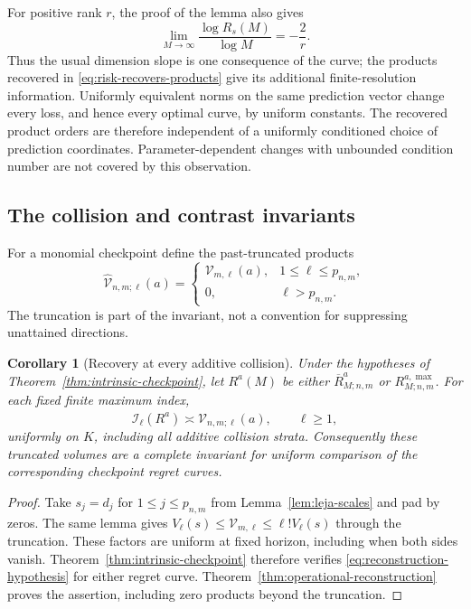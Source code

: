 \documentclass[11pt]{amsart}
\newtheorem{corollary}[theorem]{Corollary}
\theoremstyle{definition}\newtheorem{definition}[theorem]{Definition}
\theoremstyle{remark}\newtheorem{remark}[theorem]{Remark}
\begin{document}
For positive rank $r$, the proof of the lemma also gives
\[
 \lim_{M\to\infty}\frac{\log R_s(M)}{\log M}=-\frac2r.
\]
Thus the usual dimension slope is one consequence of the curve; the
products recovered in \eqref{eq:risk-recovers-products} give its
additional finite-resolution information. Uniformly equivalent norms
on the same prediction vector change every loss, and hence every
optimal curve, by uniform constants. The recovered product orders are
therefore independent of a uniformly conditioned choice of prediction
coordinates. Parameter-dependent changes with unbounded condition
number are not covered by this observation.

\subsection{The collision and contrast invariants}
For a monomial checkpoint define the past-truncated products
\[
 \widehat{\mathcal V}_{n,m;\ell}(a)=
 \begin{cases}
  \mathcal V_{m,\ell}(a),&1\le\ell\le p_{n,m},\\
  0,&\ell>p_{n,m}.
 \end{cases}
\]
The truncation is part of the invariant, not a convention for suppressing
unattained directions.

\begin{corollary}[Recovery at every additive collision]
\label{cor:monomial-operational-recovery}
Under the hypotheses of Theorem~\ref{thm:intrinsic-checkpoint}, let
$R^a(M)$ be either $\overline R^a_{M;n,m}$ or
$R^{a,\max}_{M;n,m}$. For each fixed finite maximum index,
\begin{equation}\label{eq:monomial-operational-recovery}
 \mathcal I_\ell(R^a)\asymp
       \widehat{\mathcal V}_{n,m;\ell}(a),\qquad \ell\ge1,
\end{equation}
uniformly on $K$, including all additive collision strata. Consequently
these truncated volumes are a complete invariant for uniform comparison
of the corresponding checkpoint regret curves.
\end{corollary}
\begin{proof}
Take $s_j=d_j$ for $1\le j\le p_{n,m}$ from
Lemma~\ref{lem:leja-scales} and pad by zeros. The same lemma gives
$V_\ell(s)\le\mathcal V_{m,\ell}\le\ell!V_\ell(s)$ through the
truncation. These factors are uniform at fixed horizon, including when
both sides vanish. Theorem~\ref{thm:intrinsic-checkpoint} therefore
verifies \eqref{eq:reconstruction-hypothesis} for either regret curve.
Theorem~\ref{thm:operational-reconstruction} proves the assertion,
including zero products beyond the truncation.
\end{proof}
\end{document}
